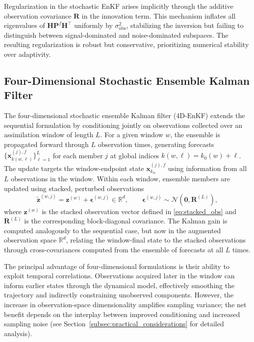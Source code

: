 \documentclass[11pt,a4paper]{article}
\begin{document}
Regularization in the stochastic EnKF arises implicitly through the additive observation covariance $\mathbf{R}$ in the innovation term. This mechanism inflates all eigenvalues of $\mathbf{H}\mathbf{P}^f\mathbf{H}^\top$ uniformly by $\sigma_{\mathrm{obs}}^2$, stabilizing the inversion but failing to distinguish between signal-dominated and noise-dominated subspaces. The resulting regularization is robust but conservative, prioritizing numerical stability over adaptivity.

\subsection{Four-Dimensional Stochastic Ensemble Kalman Filter}

The four-dimensional stochastic ensemble Kalman filter (4D-EnKF) \citep{hunt2004four,evensen2009book} extends the sequential formulation by conditioning jointly on observations collected over an assimilation window of length $L$. For a given window $w$, the ensemble is propagated forward through $L$ observation times, generating forecasts $\{\mathbf{x}_{k(w,\ell)}^{(j),f}\}_{\ell=1}^L$ for each member $j$ at global indices $k(w,\ell)=k_0(w)+\ell$. The update targets the window-endpoint state $\mathbf{x}_{k_w}^{(j),f}$ using information from all $L$ observations in the window. Within each window, ensemble members are updated using stacked, perturbed observations
\begin{equation}
\tilde{\mathbf{z}}^{(w,j)}
=
\mathbf{z}^{(w)}+\boldsymbol{\epsilon}^{(w,j)}\in \mathbb{R}^{d},
\qquad
\boldsymbol{\epsilon}^{(w,j)}\sim\mathcal{N}(\mathbf{0},\mathbf{R}^{(L)}),
\label{eq:4d_perturb}
\end{equation}
where $\mathbf{z}^{(w)}$ is the stacked observation vector defined in \eqref{eq:stacked_obs} and $\mathbf{R}^{(L)}$ is the corresponding block-diagonal covariance. The Kalman gain is computed analogously to the sequential case, but now in the augmented observation space $\mathbb{R}^{d}$, relating the window-final state to the stacked observations through cross-covariances computed from the ensemble of forecasts at all $L$ times.

The principal advantage of four-dimensional formulations is their ability to exploit temporal correlations. Observations acquired later in the window can inform earlier states through the dynamical model, effectively smoothing the trajectory and indirectly constraining unobserved components. However, the increase in observation-space dimensionality amplifies sampling variance; the net benefit depends on the interplay between improved conditioning and increased sampling noise (see Section~\ref{subsec:practical_considerations} for detailed analysis).
\end{document}
